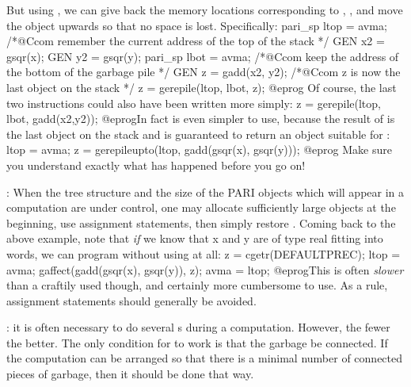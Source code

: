 But using , we can give back the memory locations corresponding
to , , and move the object  upwards so that no
space is lost. Specifically:
\bprog
  pari_sp ltop = avma;  /*@Ccom remember the current address of the top of the stack */
  GEN x2 = gsqr(x);
  GEN y2 = gsqr(y);
  pari_sp lbot = avma;  /*@Ccom keep the address of the bottom of the garbage pile */
  GEN z = gadd(x2, y2); /*@Ccom z is now the last object on the stack */
  z = gerepile(ltop, lbot, z);
@eprog
\noindent Of course, the last two instructions could also have been
written more simply:
\bprog
  z = gerepile(ltop, lbot, gadd(x2,y2));
@eprog\noindent In fact  is even simpler to use, because
the result of  is the last object on the stack and 
is guaranteed to return an object suitable for :
\bprog
  ltop = avma;
  z = gerepileupto(ltop, gadd(gsqr(x), gsqr(y)));
@eprog\noindent
Make sure you understand exactly what has happened before you go on!

: When the tree structure and
the size of the PARI objects which will appear in a computation are under
control, one may allocate sufficiently large objects at the beginning,
use assignment statements, then simply restore . Coming back to the
above example, note that \emph{if} we know that x and y are of type real
fitting into  words, we can program without using
 at all:
\bprog
  z = cgetr(DEFAULTPREC); ltop = avma;
  gaffect(gadd(gsqr(x), gsqr(y)), z);
  avma = ltop;
@eprog\noindent This is often \emph{slower} than a craftily used
 though, and certainly more cumbersome to use. As a rule,
assignment statements should generally be avoided.

: it is often necessary to do several
s during a computation. However, the fewer the better. The only
condition for  to work is that the garbage be connected. If the
computation can be arranged so that there is a minimal number of connected
pieces of garbage, then it should be done that way.

